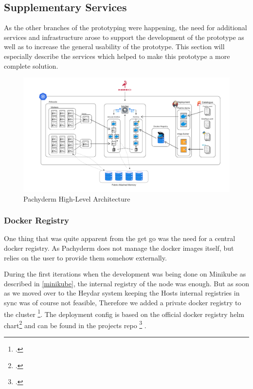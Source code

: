 \subsection{Supplementary Services}

As the other branches of the prototyping were happening, the need for additional services and infrastructure arose to 
support the development of the prototype as well as to increase the general usability of the prototype. 
This section will especially describe the services which helped to make this prototype a more complete solution.


\begin{figure}[htb]
    \centering
    \includegraphics[width=17cm]{graphics/pachykouda_complete.png}
    \caption[Pachyderm High-Level Architecture]{Pachyderm High-Level Architecture}
    \label{abb:pachyderm_complete}
\end{figure}

\subsubsection{Docker Registry}

One thing that was quite apparent from the get go was the need for a central docker registry.
As Pachyderm does not manage the docker images itself, but relies on the user to provide them somehow externally.

During the first iterations when the development was being done on Minikube as described in \ref{minikube}, the internal registry 
of the node was enough.
But as soon as we moved over to the Heydar system keeping the Hosts internal registries in sync was of course not feasible,
Therefore we added a private docker registry to the cluster \footcite{kumarHowSetupPrivate2020}.
The deployment config is based on the official docker registry helm chart\footcite{Dockerregistry10Phntom} and can be found in the projects repo \footcite{eckerthProjectRepoDocker} .

